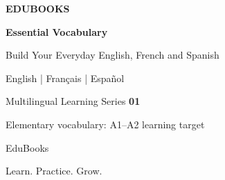 \begin{titlepage}
\thispagestyle{empty}
\centering
\vspace*{2.1cm}
{\Large\bfseries\color{EduBooksTeal} EDUBOOKS\par}
\vspace{1.8cm}
{\Huge\bfseries\color{EduBooksNavy} Essential Vocabulary\par}
\vspace{0.55cm}
{\Large Build Your Everyday English, French and Spanish\par}
\vspace{1.4cm}
{\large English \quad | \quad Français \quad | \quad Español\par}
\vfill
{\large Multilingual Learning Series \textbf{01}\par}
\vspace{0.3cm}
{\normalsize Elementary vocabulary: A1–A2 learning target\par}
\vspace{1.5cm}
{\large EduBooks\par}
{\small Learn. Practice. Grow.\par}
\vspace*{1.2cm}
\end{titlepage}
\clearpage
